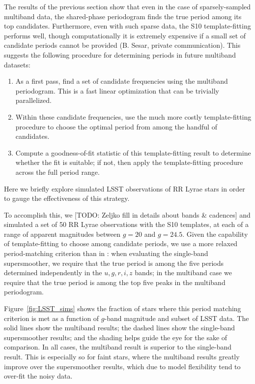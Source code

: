 \documentclass[12pt,preprint]{aastex}
\newcommand{\todo}[1]{{\color{red} [TODO: #1]}}
\newcommand{\Fig}[1]{Figure~\ref{fig:#1}}
\newcommand{\fig}[1]{\Fig{#1}}
\begin{document}
The results of the previous section show that even in the case of sparsely-sampled multiband data, the shared-phase periodogram finds the true period among its top candidates.
Furthermore, even with such sparse data, the S10 template-fitting performs well, though computationally it is extremely expensive if a small set of candidate periods cannot be provided (B. Sesar, private communication).
This suggests the following procedure for determining periods in future multiband datasets:

\begin{enumerate}
\item As a first pass, find a set of candidate frequencies using the multiband periodogram. This is a fast linear optimization that can be trivially parallelized.
\item Within these candidate frequencies, use the much more costly template-fitting procedure to choose the optimal period from among the handful of candidates.
\item Compute a goodness-of-fit statistic of this template-fitting result to determine whether the fit is suitable; if not, then apply the template-fitting procedure across the full period range.
\end{enumerate}

Here we briefly explore simulated LSST observations of RR Lyrae stars in order to gauge the effectiveness of this strategy.

To accomplish this, we \todo{Zeljko fill in details about bands \& cadences}
and simulated a set of 50 RR Lyrae observations with the S10 templates, at each of a range of apparent magnitudes between $g=20$ and $g=24.5$.
Given the capability of template-fitting to choose among candidate periods, we use a more relaxed period-matching criterion than in \citet{Oluseyi12}: when evaluating the single-band supersmoother, we require that the true period is among the five periods determined independently in the $u, g, r, i, z$ bands; in the multiband case we require that the true period is among the top five peaks in the multiband periodogram.

\fig{LSST_sims} shows the fraction of stars where this period matching criterion is met as a function of $g$-band magnitude and subset of LSST data.
The solid lines show the multiband results; the dashed lines show the single-band supersmoother results; and the shading helps guide the eye for the sake of comparison. In all cases, the multiband result is superior to the single-band result. This is especially so for faint stars, where the multiband results greatly improve over the supersmoother results, which due to model flexibility tend to over-fit the noisy data.
\end{document}
